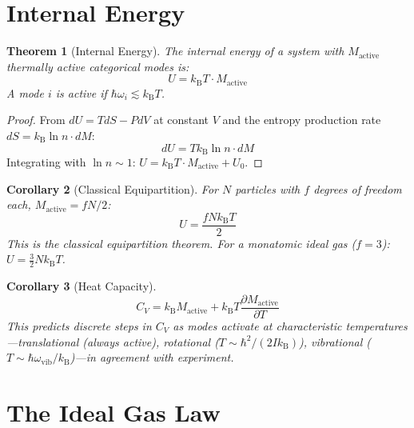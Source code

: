 \documentclass[twocolumn,10pt,a4paper]{article}
\theoremstyle{plain}
\newtheorem{theorem}{Theorem}[section]
\newtheorem{corollary}[theorem]{Corollary}
\theoremstyle{definition}
\theoremstyle{remark}
\newcommand{\kB}{k_{\mathrm{B}}}
\begin{document}
\section{Internal Energy}
\label{sec:energy}

\begin{theorem}[Internal Energy]
\label{thm:energy}
The internal energy of a system with $M_{\mathrm{active}}$ thermally active categorical modes is:
\begin{equation}
    U = \kB T \cdot M_{\mathrm{active}}
\end{equation}
A mode $i$ is active if $\hbar\omega_i \lesssim \kB T$.
\end{theorem}

\begin{proof}
From $dU = TdS - PdV$ at constant $V$ and the entropy production rate $dS = \kB \ln n \cdot dM$:
\begin{equation}
    dU = T \kB \ln n \cdot dM
\end{equation}
Integrating with $\ln n \sim 1$: $U = \kB T \cdot M_{\mathrm{active}} + U_0$.
\end{proof}

\begin{corollary}[Classical Equipartition]
For $N$ particles with $f$ degrees of freedom each, $M_{\mathrm{active}} = fN/2$:
\begin{equation}
    U = \frac{f N \kB T}{2}
\end{equation}
This is the classical equipartition theorem. For a monatomic ideal gas ($f = 3$): $U = \tfrac{3}{2}N\kB T$.
\end{corollary}

\begin{corollary}[Heat Capacity]
\begin{equation}
    C_V = \kB M_{\mathrm{active}} + \kB T \frac{\partial M_{\mathrm{active}}}{\partial T}
\end{equation}
This predicts discrete steps in $C_V$ as modes activate at characteristic temperatures---translational (always active), rotational ($T \sim \hbar^2/(2I\kB)$), vibrational ($T \sim \hbar\omega_{\mathrm{vib}}/\kB$)---in agreement with experiment.
\end{corollary}

\section{The Ideal Gas Law}
\label{sec:ideal_gas}
\end{document}
